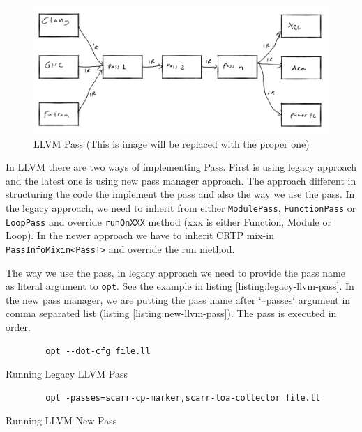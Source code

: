 \begin{figure}[htbp] 
    \centerline{\includegraphics[scale=.25]{Figures/03/llvm.png}} 
    \caption{LLVM Pass (This is image will be replaced with the proper one)} 
    \label{fig:llvm} 
\end{figure} 

In LLVM there are two ways of implementing Pass. First is using legacy approach and the latest one is using new pass manager approach. The approach different in structuring the code the implement the pass and also the way we use the pass.  In the legacy approach, we need to inherit from either \texttt{ModulePass}, \texttt{FunctionPass} or \texttt{LoopPass} and override \texttt{runOnXXX} method (xxx is either Function, Module or Loop). In the newer approach we have to inherit CRTP mix-in \texttt{PassInfoMixin<PassT>} and override the run method.

The way we use the pass, in legacy approach we need to provide the pass name as literal argument to \texttt{opt}. See the example in listing \ref{listing:legacy-llvm-pass}. In the new pass manager, we are putting the pass name after `--passes` argument in comma separated list (listing \ref{listing:new-llvm-pass}). The pass is executed in order.

\begin{listing}[htbp]
    \begin{verbatim}
        opt --dot-cfg file.ll 
    \end{verbatim}
    \caption{Running Legacy LLVM Pass}    
    \label{listing:legacy-llvm-pass}
\end{listing}

\begin{listing}[htpb]
    \begin{verbatim}
        opt -passes=scarr-cp-marker,scarr-loa-collector file.ll 
    \end{verbatim}
\caption{Running LLVM New Pass}    
\label{listing:new-llvm-pass}
\end{listing}

